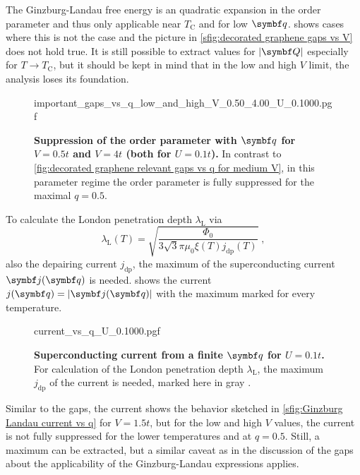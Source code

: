 \documentclass[../notes.tex]{subfiles}
\begin{document}
The Ginzburg-Landau free energy is an quadratic expansion in the order parameter and thus only applicable near \(T_{\mathrm{C}}\) and for low \(\vb{q}\).
 shows cases where this is not the case and the picture in \cref{sfig:decorated graphene gaps vs V} does not hold true.
It is still possible to extract values for \(\vert \vb{Q} \vert\) especially for \(T \to T_{\mathrm{C}}\), but it should be kept in mind that in the low and high \(V\) limit, the analysis loses its foundation.

\begin{figure}[tb]
	\centering
	{important_gaps_vs_q_low_and_high_V_0.50_4.00_U_0.1000.pgf}
	\caption[Suppression of the order parameter with \(\vb{q}\) for \(V = 0.5t\) and \(V = 4t\) (both for \(U = 0.1t\)).]{
		\textbf{Suppression of the order parameter with \(\vb{q}\) for \(V = 0.5t\) and \(V = 4t\) (both for \(U = 0.1t\)).} In contrast to \cref{fig:decorated graphene relevant gaps vs q for medium V}, in this parameter regime the order parameter is fully suppressed for the maximal \(q = 0.5\).}
	\label{fig:decorated graphene relevant gaps vs q for low and high V}
\end{figure}

To calculate the London penetration depth \(\lambda_{\mathrm{L}}\) via
\begin{equation}
	\lambda_{\mathrm{L}} (T) = \sqrt{\frac{\Phi_0}{3 \sqrt{3} \pi \mu_0 \xi (T) j_{\mathrm{dp}} (T)}}\;,
\end{equation}
also the depairing current \(j_{\mathrm{dp}}\), the maximum of the superconducting current \(\vb{j} (\vb{q})\) is needed.
 shows the current \(j (\vb{q}) = \vert \vb{j} (\vb{q}) \vert\) with the maximum marked for every temperature.
\begin{figure}[tb]
	\centering
	{current_vs_q_U_0.1000.pgf}
	\caption[Superconducting current from a finite \(\vb{q}\) for \(U = 0.1 t\).]{
		\textbf{Superconducting current from a finite \(\vb{q}\) for \(U = 0.1 t\).} For calculation of the London penetration depth \(\lambda_{\mathrm{L}}\), the maximum \(j_{\mathrm{dp}}\) of the current is needed, marked here in gray .
	}
	\label{fig:decorated graphene current vs q}
\end{figure}
Similar to the gaps, the current shows the behavior sketched in \cref{sfig:Ginzburg Landau current vs q} for \(V = 1.5t\), but for the low and high \(V\) values, the current is not fully suppressed for the lower temperatures and at \(q = 0.5\).
Still, a maximum can be extracted, but a similar caveat as in the discussion of the gaps about the applicability of the Ginzburg-Landau expressions applies.
\end{document}
